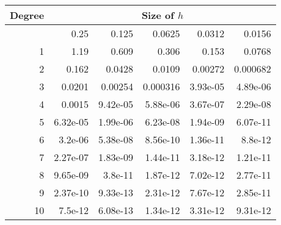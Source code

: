 \begin{tabular}{|r|r|r|r|r|r|}    
    \hline
    Degree &        \multicolumn{5}{c|}{Size of $h$}          \\

    \hline
    & 0.25     & 0.125    & 0.0625   & 0.0312   & 0.0156   \\
    \hline
 1  & 1.19     & 0.609    & 0.306    & 0.153    & 0.0768   \\
    \hline
 2  & 0.162    & 0.0428   & 0.0109   & 0.00272  & 0.000682 \\
    \hline
 3  & 0.0201   & 0.00254  & 0.000316 & 3.93e-05 & 4.89e-06 \\
    \hline
 4  & 0.0015   & 9.42e-05 & 5.88e-06 & 3.67e-07 & 2.29e-08 \\
    \hline
 5  & 6.32e-05 & 1.99e-06 & 6.23e-08 & 1.94e-09 & 6.07e-11 \\
    \hline
 6  & 3.2e-06  & 5.38e-08 & 8.56e-10 & 1.36e-11 & 8.8e-12  \\
    \hline
 7  & 2.27e-07 & 1.83e-09 & 1.44e-11 & 3.18e-12 & 1.21e-11 \\
    \hline
 8  & 9.65e-09 & 3.8e-11  & 1.87e-12 & 7.02e-12 & 2.77e-11 \\
    \hline
 9  & 2.37e-10 & 9.33e-13 & 2.31e-12 & 7.67e-12 & 2.85e-11 \\
    \hline
 10 & 7.5e-12  & 6.08e-13 & 1.34e-12 & 3.31e-12 & 9.31e-12 \\
\hline
\end{tabular}